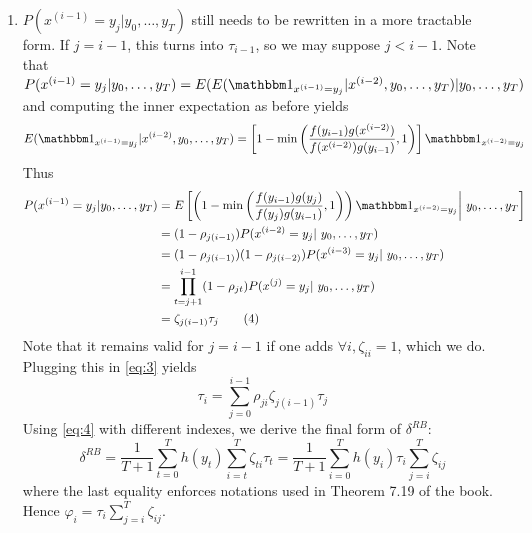 \documentclass[a4paper,11pt, hidelinks]{article}
\begin{document}
\begin{enumerate}[label=(\alph*)]
    \item $P(x^{(i-1)}=y_j| y_0,\ldots,y_T)$ still needs to be rewritten in a more tractable form. If $j=i-1$, this turns into $\tau_{i-1}$, so we may suppose $j<i-1$.\newline
    Note that $P(x^{(i-1)}=y_j| y_0,\ldots,y_T) = E(E(\mathbbm 1_{x^{(i-1)}=y_j}|x^{(i-2)}, y_0,\ldots,y_T)|y_0,\ldots,y_T)$ and computing the inner expectation as before yields $$E(\mathbbm 1_{x^{(i-1)}=y_j}|x^{(i-2)}, y_0,\ldots,y_T) = \left[1-\min \left(\frac{f(y_{i-1})g(x^{(i-2)})}{f(x^{(i-2)})g(y_{i-1})},1 \right)\right]\mathbbm 1_{x^{(i-2)}=y_j}$$
    Thus \begin{align*}P(x^{(i-1)}=y_j| y_0,\ldots,y_T)  &= E\left[\left(1-\min \left(\frac{f(y_{i-1})g(y_j)}{f(y_j)g(y_{i-1})},1 \right)\right)\mathbbm 1_{x^{(i-2)}=y_j} \bigg| y_0,\ldots,y_T\right] \\
    &= (1-\rho_{j(i-1)}) P(x^{(i-2)}=y_j| y_0,\ldots,y_T) \\
    &= (1-\rho_{j(i-1)}) (1-\rho_{j(i-2)})P(x^{(i-3)}=y_j| y_0,\ldots,y_T) \\
    &= \prod_{t=j+1}^{i-1}(1-\rho_{jt}) P(x^{(j)}=y_j| y_0,\ldots,y_T)\\
    &= \zeta_{j(i-1)} \tau_j \tag{4}\label{eq:4}
    \end{align*}
    Note that it remains valid for $j=i-1$ if one adds $\forall i, \zeta_{ii}=1$, which we do.
    Plugging this in \eqref{eq:3} yields $$\tau_i = \sum_{j=0}^{i-1} \rho_{ji}\zeta_{j(i-1)} \tau_j$$
    Using \eqref{eq:4} with different indexes, we derive the final form of $\delta^{RB}$:
    $$\delta^{RB} = \frac 1{T+1} \sum_{t=0}^{T}h(y_t)\sum_{i=t}^T \zeta_{ti} \tau_t = \frac 1{T+1} \sum_{i=0}^{T}h(y_i)\tau_i\sum_{j=i}^T \zeta_{ij}$$ where the last equality enforces notations used in Theorem 7.19 of the book. Hence $\varphi_i = \tau_i\sum_{j=i}^T \zeta_{ij}$.
\end{enumerate}
\end{document}
